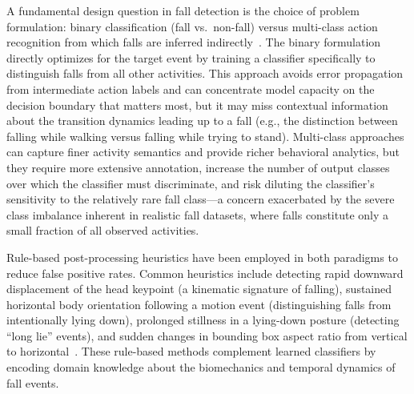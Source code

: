 A fundamental design question in fall detection is the choice of problem formulation: binary classification (fall vs.\ non-fall) versus multi-class action recognition from which falls are inferred indirectly~\cite{wang2020elderly}. The binary formulation directly optimizes for the target event by training a classifier specifically to distinguish falls from all other activities. This approach avoids error propagation from intermediate action labels and can concentrate model capacity on the decision boundary that matters most, but it may miss contextual information about the transition dynamics leading up to a fall (e.g., the distinction between falling while walking versus falling while trying to stand). Multi-class approaches~\cite{zhang2012rgb} can capture finer activity semantics and provide richer behavioral analytics, but they require more extensive annotation, increase the number of output classes over which the classifier must discriminate, and risk diluting the classifier's sensitivity to the relatively rare fall class---a concern exacerbated by the severe class imbalance inherent in realistic fall datasets, where falls constitute only a small fraction of all observed activities.

Rule-based post-processing heuristics have been employed in both paradigms to reduce false positive rates. Common heuristics include detecting rapid downward displacement of the head keypoint (a kinematic signature of falling), sustained horizontal body orientation following a motion event (distinguishing falls from intentionally lying down), prolonged stillness in a lying-down posture (detecting ``long lie'' events), and sudden changes in bounding box aspect ratio from vertical to horizontal~\cite{charfi2013optimized, rougier2011robust}. These rule-based methods complement learned classifiers by encoding domain knowledge about the biomechanics and temporal dynamics of fall events.

